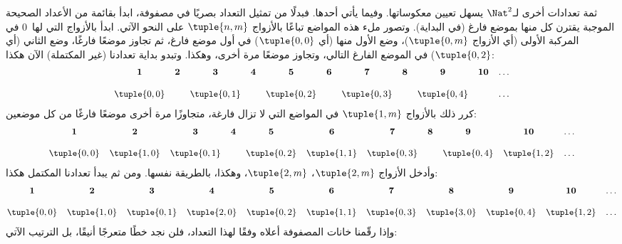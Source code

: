 \documentclass[../../../include/open-logic-section]{subfiles}
\begin{document}


\begin{explain}
ثمة تعدادات أخرى لـ$\Nat^2$ يسهل تعيين معكوساتها. وفيما يأتي
أحدها. فبدلًا من تمثيل التعداد بصريًا في مصفوفة، ابدأ بقائمة من
الأعداد الصحيحة الموجبة يقترن كل منها بموضع فارغ (في البداية). وتصور
ملء هذه المواضع تباعًا بالأزواج $\tuple{n,m}$ على النحو الآتي.
ابدأ بالأزواج التي لها~$0$ في المركبة الأولى (أي الأزواج
$\tuple{0,m}$)، وضع الأول منها (أي $\tuple{0,0}$) في أول موضع فارغ،
ثم تجاوز موضعًا فارغًا، وضع الثاني (أي $\tuple{0,2}$) في الموضع
الفارغ التالي، وتجاوز موضعًا مرة أخرى، وهكذا. وتبدو بداية تعدادنا
(غير المكتملة) الآن هكذا:
\[\small
\begin{array}{@{}c c c c c c c c c c c@{}}
\mathbf 1 & \mathbf 2 & \mathbf 3 & \mathbf 4 & \mathbf 5 & \mathbf 6 & \mathbf 7 & \mathbf 8 & \mathbf 9 & \mathbf{10} & \dots \\ \\
\tuple{0,0} &  & \tuple{0,1} &  & \tuple{0,2} &  & \tuple{0,3} & & \tuple{0,4} &  & \dots \\
\end{array}
\]
كرر ذلك بالأزواج $\tuple{1,m}$ في المواضع التي لا تزال فارغة،
متجاوزًا مرة أخرى موضعًا فارغًا من كل موضعين:
\[\small
\begin{array}{@{}c c c c c c c c c c c@{}}
\mathbf 1 & \mathbf 2 & \mathbf 3 & \mathbf 4 & \mathbf 5 & \mathbf 6 & \mathbf 7 & \mathbf 8 & \mathbf 9 & \mathbf{10} & \dots \\ \\
\tuple{0,0} & \tuple{1,0} & \tuple{0,1} &  & \tuple{0,2} & \tuple{1,1} &
\tuple{0,3} & & \tuple{0,4} &  \tuple{1,2} & \dots \\
\end{array}
\]
وأدخل الأزواج $\tuple{2,m}$، $\tuple{2,m}$، وهكذا، بالطريقة نفسها.
ومن ثم يبدأ تعدادنا المكتمل هكذا:
\[\small
\begin{array}{@{}cc c c c c c c c c c@{}}
\mathbf 1 & \mathbf 2 & \mathbf 3 & \mathbf 4 & \mathbf 5 & \mathbf 6 & \mathbf 7 & \mathbf 8 & \mathbf 9 & \mathbf{10} & \dots \\ \\
\tuple{0,0} & \tuple{1,0} & \tuple{0,1} & \tuple{2,0}  & \tuple{0,2} &
\tuple{1,1} & \tuple{0,3} & \tuple{3,0}  & \tuple{0,4} &  \tuple{1,2} & \dots \\
\end{array}
\]
وإذا رقّمنا خانات المصفوفة أعلاه وفقًا لهذا التعداد، فلن نجد خطًا
متعرجًا أنيقًا، بل الترتيب الآتي:

\end{explain}
\end{document}

